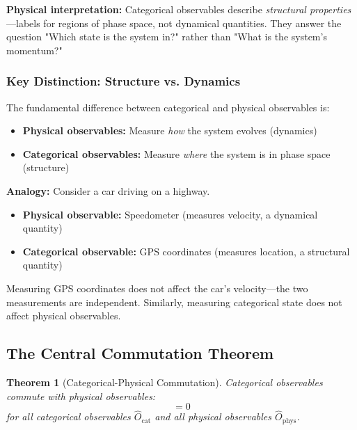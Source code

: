 \documentclass[twocolumn,10pt]{article}
\newtheorem{theorem}{Theorem}[section]
\theoremstyle{remark}
\begin{document}
\textbf{Physical interpretation:} Categorical observables describe \textit{structural properties}—labels for regions of phase space, not dynamical quantities. They answer the question "Which state is the system in?" rather than "What is the system's momentum?"

\subsubsection{Key Distinction: Structure vs. Dynamics}

The fundamental difference between categorical and physical observables is:

\begin{itemize}
    \item \textbf{Physical observables:} Measure \textit{how} the system evolves (dynamics)
    \item \textbf{Categorical observables:} Measure \textit{where} the system is in phase space (structure)
\end{itemize}

\textbf{Analogy:} Consider a car driving on a highway.
\begin{itemize}
    \item \textbf{Physical observable:} Speedometer (measures velocity, a dynamical quantity)
    \item \textbf{Categorical observable:} GPS coordinates (measures location, a structural quantity)
\end{itemize}

Measuring GPS coordinates does not affect the car's velocity—the two measurements are independent. Similarly, measuring categorical state does not affect physical observables.

\subsection{The Central Commutation Theorem}

\begin{theorem}[Categorical-Physical Commutation]
\label{thm:categorical_physical_commutation}
Categorical observables commute with physical observables:
\begin{equation}
    [\hat{O}_{\text{cat}}, \hat{O}_{\text{phys}}] = 0
    \label{eq:commutation_theorem}
\end{equation}
for all categorical observables $\hat{O}_{\text{cat}}$ and all physical observables $\hat{O}_{\text{phys}}$.
\end{theorem}
\end{document}
